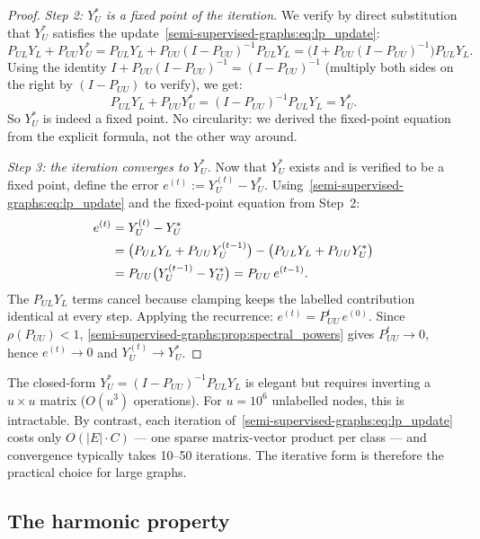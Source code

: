 \begin{notechapter}
\begin{proof}
\emph{Step 2: $Y_U^*$ is a fixed point of the iteration.}
We verify by direct substitution that $Y_U^*$ satisfies the
update~\eqref{semi-supervised-graphs:eq:lp_update}:
\[
  P_{UL}Y_L + P_{UU}Y_U^*
  = P_{UL}Y_L + P_{UU}(I-P_{UU})^{-1}P_{UL}Y_L
  = \bigl(I + P_{UU}(I-P_{UU})^{-1}\bigr)P_{UL}Y_L.
\]
Using the identity $I + P_{UU}(I-P_{UU})^{-1} = (I-P_{UU})^{-1}$
(multiply both sides on the right by $(I-P_{UU})$ to verify), we get:
\[
  P_{UL}Y_L + P_{UU}Y_U^* = (I-P_{UU})^{-1}P_{UL}Y_L = Y_U^*.
\]
So $Y_U^*$ is indeed a fixed point. No circularity: we derived the fixed-point
equation from the explicit formula, not the other way around.

\emph{Step 3: the iteration converges to $Y_U^*$.}
Now that $Y_U^*$ exists and is verified to be a fixed point, define the error
$e^{(t)} := Y_U^{(t)} - Y_U^*$. Using~\eqref{semi-supervised-graphs:eq:lp_update} and the fixed-point
equation from Step~2:
\begin{align}
e^{(t)} &= Y_U^{(t)} - Y_U^* \notag\\
&= \bigl(P_{UL}Y_L + P_{UU}Y_U^{(t-1)}\bigr)
 - \bigl(P_{UL}Y_L + P_{UU}Y_U^*\bigr) \notag\\
&= P_{UU}\bigl(Y_U^{(t-1)} - Y_U^*\bigr) = P_{UU}\,e^{(t-1)}.
\end{align}
The $P_{UL}Y_L$ terms cancel because clamping keeps the labelled contribution
identical at every step. Applying the recurrence:
$e^{(t)} = P_{UU}^t\,e^{(0)}$.
Since $\rho(P_{UU}) < 1$, \cref{semi-supervised-graphs:prop:spectral_powers} gives
$P_{UU}^t \to 0$, hence $e^{(t)} \to 0$ and $Y_U^{(t)} \to Y_U^*$.
\end{proof}

\begin{remark}
\label{semi-supervised-graphs:rem:why_iterative}
The closed-form $Y_U^* = (I - P_{UU})^{-1}P_{UL}Y_L$ is elegant but
requires inverting a $u \times u$ matrix ($O(u^3)$ operations). For
$u = 10^6$ unlabelled nodes, this is intractable. By contrast, each iteration
of~\eqref{semi-supervised-graphs:eq:lp_update} costs only $O(|E| \cdot C)$ --- one sparse
matrix-vector product per class --- and convergence typically takes 10--50
iterations. The iterative form is therefore the practical choice for large
graphs.
\end{remark}

\subsection{The harmonic property}
\label{semi-supervised-graphs:subsec:harmonic}


\end{notechapter}
